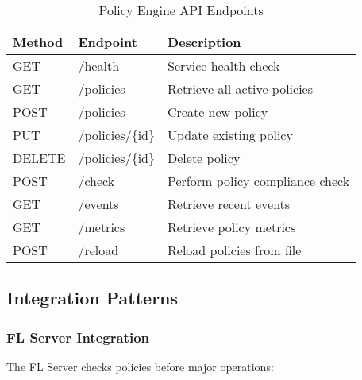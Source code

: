 \begin{table}[H]
\centering
\caption{Policy Engine API Endpoints}
\label{tab:policy-api-endpoints}
\begin{tabular}{@{}llp{5cm}@{}}
\toprule
\textbf{Method} & \textbf{Endpoint} & \textbf{Description} \\
\midrule
GET & /health & Service health check \\
GET & /policies & Retrieve all active policies \\
POST & /policies & Create new policy \\
PUT & /policies/\{id\} & Update existing policy \\
DELETE & /policies/\{id\} & Delete policy \\
POST & /check & Perform policy compliance check \\
GET & /events & Retrieve recent events \\
GET & /metrics & Retrieve policy metrics \\
POST & /reload & Reload policies from file \\
\bottomrule
\end{tabular}
\end{table}

\subsection{Integration Patterns}

\subsubsection{FL Server Integration}

The FL Server checks policies before major operations:

